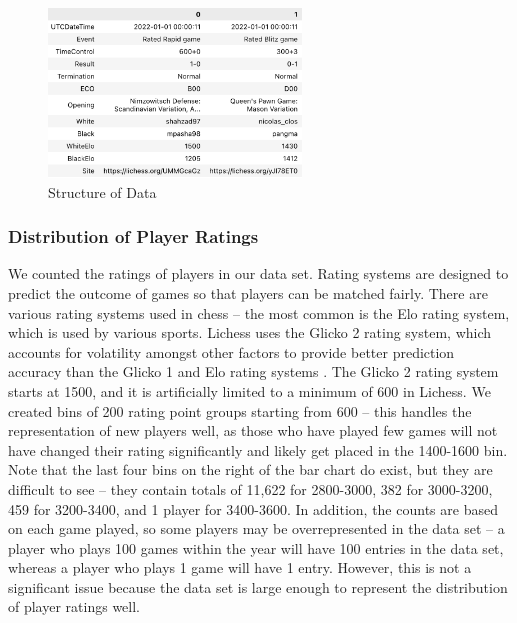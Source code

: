 \documentclass[a4paper, 11pt]{article}
\begin{document}
\begin{figure}[H]
    \centering
    \caption{Structure of Data}
    \label{fig:structureOfData}
    \includegraphics[width=0.6\textwidth]{Structure of Data Transposed.png}
\end{figure}

\subsubsection{Distribution of Player Ratings}
We counted the ratings of players in our data set. Rating systems are designed to predict the outcome of games so that players can be matched fairly. There are various rating systems used in chess -- the most common is the Elo rating system, which is used by various sports. Lichess uses the Glicko 2 rating system, which accounts for volatility amongst other factors to provide better prediction accuracy than the Glicko 1 and Elo rating systems \cite{chessRatingSystems, DeloitteFIDEChessRatingChallenge}. The Glicko 2 rating system starts at 1500, and it is artificially limited to a minimum of 600 in Lichess. We created bins of 200 rating point groups starting from 600 -- this handles the representation of new players well, as those who have played few games will not have changed their rating significantly and likely get placed in the 1400-1600 bin. Note that the last four bins on the right of the bar chart do exist, but they are difficult to see -- they contain totals of 11,622 for 2800-3000, 382 for 3000-3200, 459 for 3200-3400, and 1 player for 3400-3600. In addition, the counts are based on each game played, so some players may be overrepresented in the data set -- a player who plays 100 games within the year will have 100 entries in the data set, whereas a player who plays 1 game will have 1 entry. However, this is not a significant issue because the data set is large enough to represent the distribution of player ratings well.
\end{document}
